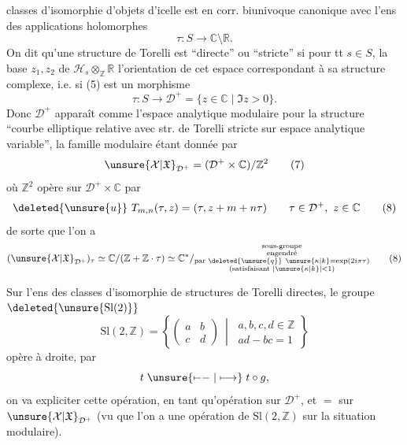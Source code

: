 classes d'isomorphie d'objets d'icelle est en corr. biunivoque canonique avec l'ens des applications holomorphes
\begin{equation}
\tau:S\longrightarrow\mathbb C\setminus\mathbb R.
\tag{5}
\end{equation}
On dit qu'une structure de Torelli est ``directe'' ou ``stricte'' si  pour tt $s\in S$, la base  $z_1,z_2$ de $\mathcal H_s\otimes_{\mathbb Z}\mathbb R$  l'orientation de cet espace correspondant à sa structure complexe, i.e. si (5) est un morphisme
\begin{equation}
\tau:S\longrightarrow\mathcal D^+=\{z\in\mathbb C\mid\Im z>0\}.
\tag{6}
\end{equation}
Donc $\mathcal D^+$ apparaît comme l'espace analytique modulaire pour la structure ``courbe elliptique relative avec str. de Torelli stricte sur espace analytique variable'', la famille modulaire étant donnée par
\begin{equation}
\unsure{\mathcal X|\mathfrak X}_{\mathcal D^+}=(\mathcal D^+\times\mathbb C)/\mathbb Z^2
\tag{7}
\end{equation}
où $\mathbb Z^2$ opère sur $\mathcal D^+\times\mathbb C$ par
\begin{equation}
\deleted{\unsure{u}}\ T_{m,n}(\tau,z)=(\tau,z+m+n\tau)
\qquad\tau\in\mathcal D^+,\ z\in\mathbb C
\tag{8}
\end{equation}
de sorte que l'on a
\begin{equation}
(\unsure{\mathcal X|\mathfrak X}_{\mathcal D^+})_\tau
\simeq\mathbb C/(\mathbb Z+\mathbb Z\cdot\tau)
\simeq\mathbb C^*/\substack{\text{sous-groupe}\\
\text{engendré}\\
\text{par }\deleted{\unsure{q}}\ \unsure{\kappa|k}=\exp(2i\pi\tau)\\
(\text{satisfaisant }|\unsure{\kappa|k}|<1)}
\tag{8}
\end{equation}

Sur l'ens des  classes d'isomorphie de structures de Torelli directes, le groupe
$\deleted{\unsure{\mathrm{Sl}(2)}}$
\begin{equation}
\mathrm{Sl}(2,\mathbb Z)=
\left\{\begin{pmatrix}a&b\\c&d\end{pmatrix}
\ \middle|\ 
\begin{gathered}
a,b,c,d\in\mathbb Z\\
ad-bc=1
\end{gathered}\right\}
\tag{9}
\end{equation}
opère à droite, par
\[
t\mathrel{\unsure{\mapstochar\relbar\relbar|\longmapsto}}t\circ g,
\]
on va expliciter cette opération, en tant qu'opération sur $\mathcal D^+$, et $=$ sur $\unsure{\mathcal X|\mathfrak X}_{\mathcal D^+}$ (vu que l'on a une opération de $\mathrm{Sl}(2,\mathbb Z)$ sur la situation modulaire).

